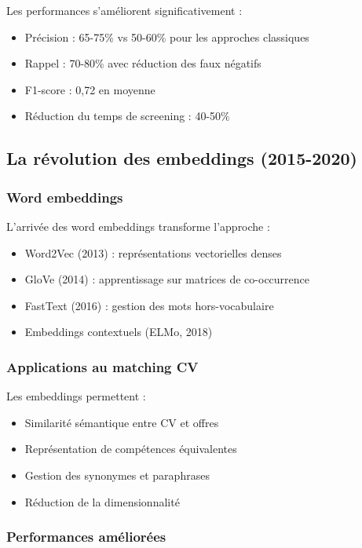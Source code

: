 \documentclass[12pt,a4paper]{report}
\begin{document}
Les performances s'améliorent significativement :
\begin{itemize}
\item Précision : 65-75\% vs 50-60\% pour les approches classiques
\item Rappel : 70-80\% avec réduction des faux négatifs
\item F1-score : 0,72 en moyenne
\item Réduction du temps de screening : 40-50\%
\end{itemize}

\subsection{La révolution des embeddings (2015-2020)}

\subsubsection{Word embeddings}

L'arrivée des word embeddings transforme l'approche :
\begin{itemize}
\item Word2Vec (2013) : représentations vectorielles denses
\item GloVe (2014) : apprentissage sur matrices de co-occurrence
\item FastText (2016) : gestion des mots hors-vocabulaire
\item Embeddings contextuels (ELMo, 2018)
\end{itemize}

\subsubsection{Applications au matching CV}

Les embeddings permettent :
\begin{itemize}
\item Similarité sémantique entre CV et offres
\item Représentation de compétences équivalentes
\item Gestion des synonymes et paraphrases
\item Réduction de la dimensionnalité
\end{itemize}

\subsubsection{Performances améliorées}
\end{document}
